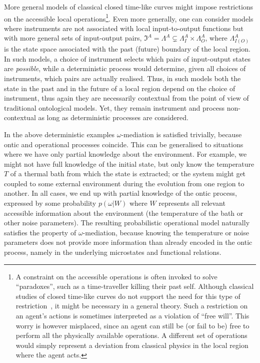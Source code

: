 \documentclass[a4paper,onecolumn,11pt,accepted=2018-05-04]{quantumarticle}
\begin{document}
More general models of classical closed time-like curves might impose restrictions on the accessible local operations\footnote{ A constraint on the accessible operations is often invoked to solve ``paradoxes'', such as a time-traveller killing their past self. Although classical studies of closed time-like curves do not support the need for this type of restriction~\cite{Friedman:1990ja, Echeverria:1991ko, Lossev1992, Novikov1992, Mikheeva1993}, it might be necessary in a general theory. Such a restriction on an agent's actions is sometimes interpreted as a violation of ``free will''. This worry is however misplaced, since an agent can still be (or fail to be) free to perform all the physically available operations. A different set of operations would simply represent a deviation from classical physics in the local region where the agent acts.}. Even more generally, one can consider models where instruments are not associated with local input-to-output functions but with more general sets of input-output pairs, $\mathfrak{I}^A=\Lambda^A\subsetneq \Lambda^A_I\times\Lambda^A_O$, where $\Lambda^A_{I (O)}$ is the state space associated with the past (future) boundary of the local region. In such models, a choice of instrument selects which pairs of input-output states are \emph{possible}, while a deterministic process would determine, given all choices of instruments, which pairs are actually realised. Thus, in such models both the state in the past and in the future of a local region depend on the choice of instrument, thus again they are necessarily contextual from the point of view of traditional ontological models. Yet, they remain instrument and process non-contextual as long as deterministic processes are considered.


In the above deterministic examples $\omega$-mediation is satisfied trivially, because ontic and operational processes coincide. This can be generalised to situations where we have only partial knowledge about the environment. For example, we might not have full knowledge of the initial state, but only know the temperature $T$ of a thermal bath from which the state is extracted; or the system might get coupled to some external environment during the evolution from one region to another. In all cases, we end up with partial knowledge of the ontic process, expressed by some probability $p(\omega|W)$ where $W$ represents all relevant accessible information about the environment (the temperature of the bath or other noise parameters). The resulting probabilistic operational model naturally satisfies the property of $\omega$-mediation, because knowing the temperature or noise parameters does not provide more information than already encoded in the ontic process, namely in the underlying microstates and functional relations. 
\end{document}

